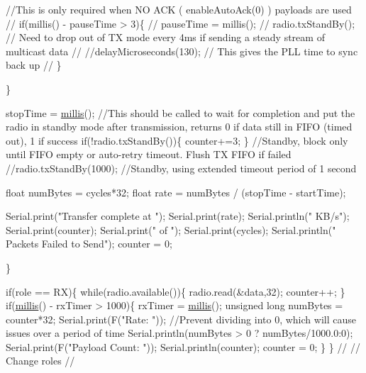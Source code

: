 \begin{DoxyCodeInclude}
      \textcolor{comment}{//This is only required when NO ACK ( enableAutoAck(0) ) payloads are used}
\textcolor{comment}{//      if(millis() - pauseTime > 3)\{}
\textcolor{comment}{//        pauseTime = millis();}
\textcolor{comment}{//        radio.txStandBy();          // Need to drop out of TX mode every 4ms if sending a steady stream
       of multicast data}
\textcolor{comment}{//        //delayMicroseconds(130);     // This gives the PLL time to sync back up   }
\textcolor{comment}{//      \}}
      
    \}
    
   stopTime = \hyperlink{group__Porting__General_gad5b3ec1ce839fa1c4337a7d0312e9749}{millis}();   
                                         \textcolor{comment}{//This should be called to wait for completion and put the radio
       in standby mode after transmission, returns 0 if data still in FIFO (timed out), 1 if success}
   \textcolor{keywordflow}{if}(!radio.txStandBy())\{ counter+=3; \} \textcolor{comment}{//Standby, block only until FIFO empty or auto-retry timeout.
       Flush TX FIFO if failed}
   \textcolor{comment}{//radio.txStandBy(1000);              //Standby, using extended timeout period of 1 second}
   
   \textcolor{keywordtype}{float} numBytes = cycles*32;
   \textcolor{keywordtype}{float} rate = numBytes / (stopTime - startTime);
    
   Serial.print(\textcolor{stringliteral}{"Transfer complete at "}); Serial.print(rate); Serial.println(\textcolor{stringliteral}{" KB/s"});
   Serial.print(counter); Serial.print(\textcolor{stringliteral}{" of "}); Serial.print(cycles); Serial.println(\textcolor{stringliteral}{" Packets Failed to
       Send"});
   counter = 0;   
    
   \}
  
  
  
\textcolor{keywordflow}{if}(role == RX)\{
     \textcolor{keywordflow}{while}(radio.available())\{       
      radio.read(&data,32);
      counter++;
     \}
   \textcolor{keywordflow}{if}(\hyperlink{group__Porting__General_gad5b3ec1ce839fa1c4337a7d0312e9749}{millis}() - rxTimer > 1000)\{
     rxTimer = \hyperlink{group__Porting__General_gad5b3ec1ce839fa1c4337a7d0312e9749}{millis}();     
     \textcolor{keywordtype}{unsigned} \textcolor{keywordtype}{long} numBytes = counter*32;
     Serial.print(F(\textcolor{stringliteral}{"Rate: "}));
     \textcolor{comment}{//Prevent dividing into 0, which will cause issues over a period of time}
     Serial.println(numBytes > 0 ? numBytes/1000.0:0);
     Serial.print(F(\textcolor{stringliteral}{"Payload Count: "}));
     Serial.println(counter);
     counter = 0;
   \}
  \}
  \textcolor{comment}{//}
  \textcolor{comment}{// Change roles}
  \textcolor{comment}{//}


\end{DoxyCodeInclude}

